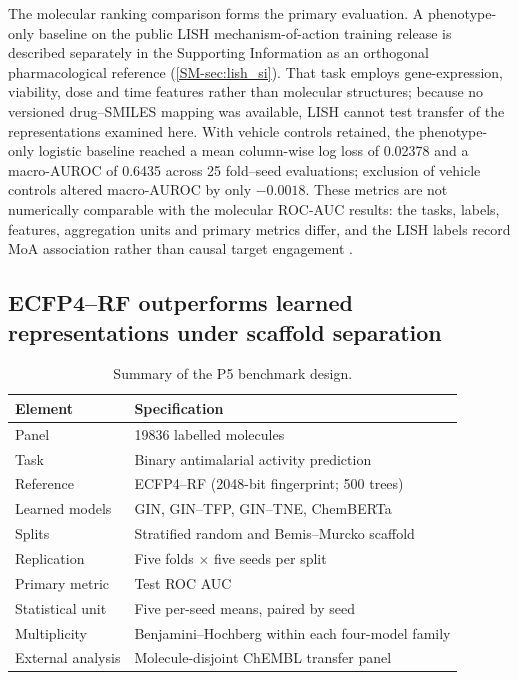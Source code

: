 \documentclass[11pt,a4paper]{article}
\begin{document}
The molecular ranking comparison forms the primary evaluation. A phenotype-only baseline on the public LISH mechanism-of-action training release is described separately in the Supporting Information as an orthogonal pharmacological reference (\cref{SM-sec:lish_si}). That task employs gene-expression, viability, dose and time features rather than molecular structures; because no versioned drug--SMILES mapping was available, LISH cannot test transfer of the representations examined here. With vehicle controls retained, the phenotype-only logistic baseline reached a mean column-wise log loss of \num{0.02378} and a macro-AUROC of \num{0.6435} across \num{25} fold--seed evaluations; exclusion of vehicle controls altered macro-AUROC by only $-\num{0.0018}$. These metrics are not numerically comparable with the molecular ROC-AUC results: the tasks, labels, features, aggregation units and primary metrics differ, and the LISH labels record MoA association rather than causal target engagement \citep{Trapotsi2022MoA}.

\subsection{ECFP4--RF outperforms learned representations under scaffold separation}

%
\begin{table}[ht!]
	\centering
	\caption{Summary of the P5 benchmark design.}
	\label{tab:study_design}
	\begin{tabular}{ll}
		\toprule
		Element & Specification \\
		\midrule
		Panel & \num{19836} labelled molecules \\
		Task & Binary antimalarial activity prediction \\
		Reference & ECFP4--RF (\num{2048}-bit fingerprint; \num{500} trees) \\
		Learned models & GIN, GIN--TFP, GIN--TNE, ChemBERTa \\
		Splits & Stratified random and Bemis--Murcko scaffold \\
		Replication & Five folds $\times$ five seeds per split \\
		Primary metric & Test ROC AUC \\
		Statistical unit & Five per-seed means, paired by seed \\
		Multiplicity & Benjamini--Hochberg within each four-model family \\
		External analysis & Molecule-disjoint ChEMBL transfer panel \\
		\bottomrule
	\end{tabular}
\end{table}
\end{document}
